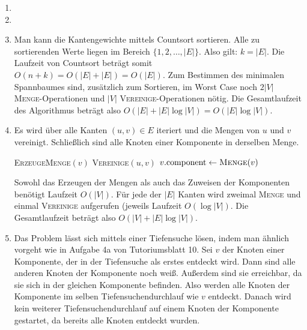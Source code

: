\documentclass[11pt,a4paper]{article}
\begin{document}
\begin{loesung}
    \begin{enumerate}
        \item 
        \item
        \item Man kann die Kantengewichte mittels Countsort sortieren.
        Alle zu sortierenden Werte liegen im Bereich $\{1, 2, \ldots, |E|\}$.
        Also gilt: $k = |E|$.
        Die Laufzeit von Countsort beträgt somit $O(n + k) = O(|E| + |E|) = O(|E|)$.
        Zum Bestimmen des minimalen Spannbaumes sind, zusätzlich zum Sortieren, im Worst Case noch $2|V|$ \textsc{Menge}-Operationen und $|V|$ \textsc{Vereinige}-Operationen nötig.
        Die Gesamtlaufzeit des Algorithmus beträgt also $O(|E| + |E| \log |V|) = O(|E| \log |V|)$.
        \item
        Es wird über alle Kanten $(u, v) \in E$ iteriert und die Mengen von $u$ und $v$ vereinigt.
        Schließlich sind alle Knoten einer Komponente in derselben Menge.
        \begin{algorithmic}[1]
                    \State \textsc{ErzeugeMenge}$(v)$
                \EndFor
                        \State \textsc{Vereinige}$(u, v)$
                    \EndIf
                \EndFor
                    \State $v.\mathrm{component} \gets \text{\textsc{Menge}}(v)$
                \EndFor
            \EndProcedure
        \end{algorithmic}
        Sowohl das Erzeugen der Mengen als auch das Zuweisen der Komponenten benötigt Laufzeit $O(|V|)$.
        Für jede der $|E|$ Kanten wird zweimal \textsc{Menge} und einmal \textsc{Vereinige} aufgerufen (jeweils Laufzeit $O(\log |V|)$.
        Die Gesamtlaufzeit beträgt also $O(|V| + |E| \log |V|)$.

        \item Das Problem lässt sich mittels einer Tiefensuche lösen, indem man ähnlich vorgeht wie in Aufgabe 4a von Tutoriumsblatt 10.
        Sei $v$ der Knoten einer Komponente, der in der Tiefensuche als erstes entdeckt wird.
        Dann sind alle anderen Knoten der Komponente noch weiß.
        Außerdem sind sie erreichbar, da sie sich in der gleichen Komponente befinden.
        Also werden alle Knoten der Komponente im selben Tiefensuchendurchlauf wie $v$ entdeckt.
        Danach wird kein weiterer Tiefensuchendurchlauf auf einem Knoten der Komponente gestartet, da bereits alle Knoten entdeckt wurden.


\end{enumerate}
\end{loesung}
\end{document}

